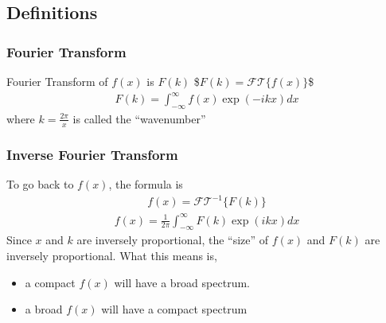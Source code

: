 \documentclass[letterpaper,10pt,english]{jupyterBook}
\begin{document}
\subsection{Definitions}
\label{\detokenize{fFy:definitions}}

\subsubsection{Fourier Transform}
\label{\detokenize{fFy:id1}}
\sphinxAtStartPar
Fourier Transform of \(f(x)\) is \(F(k)\)
\$\(
F(k) = \mathcal{FT}\{f(x)\}
\)\$
\begin{equation*}
\begin{split}
F(k) = \int_{-\infty}^{\infty}f(x) \exp(-ikx)dx
\end{split}
\end{equation*}
\sphinxAtStartPar
where \(k=\frac{2\pi}{x}\) is called the “wavenumber”


\subsubsection{Inverse Fourier Transform}
\label{\detokenize{fFy:inverse-fourier-transform}}
\sphinxAtStartPar
To go back to \(f(x)\), the formula is
\begin{equation*}
\begin{split}
f(x) = \mathcal{FT}^{-1}\{F(k)\}
\end{split}
\end{equation*}\begin{equation*}
\begin{split}
f(x) = \frac{1}{2\pi} \int_{-\infty}^{\infty}F(k) \exp(ikx)dx
\end{split}
\end{equation*}
\sphinxAtStartPar
Since \(x\) and \(k\) are inversely proportional, the “size” of \(f(x)\) and \(F(k)\) are inversely proportional.
What this means is,
\begin{itemize}
\item {} 
\sphinxAtStartPar
a compact \(f(x)\) will have a broad spectrum.

\item {} 
\sphinxAtStartPar
a broad \(f(x)\) will have a compact spectrum

\end{itemize}
\end{document}

